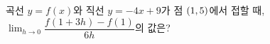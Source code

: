 곡선 $y=f(x)$와 직선 $y=-4x+9$가 점 $(1{,}\mkern3mu\mathopen{}5)$에서 접할 때, $\displaystyle\lim_{h\to 0}\dfrac{f(1+3h)-f(1)}{6h}$의 값은?
